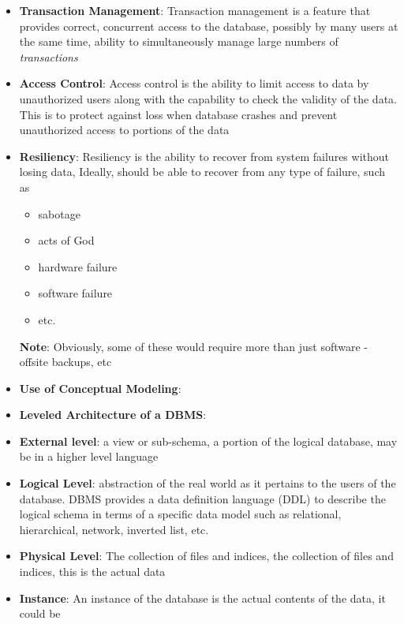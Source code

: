 \documentclass{report}
\begin{document}
\begin{itemize}
\begin{itemize}
            \end{itemize}
        \item \textbf{Transaction Management}: Transaction management is a feature that provides correct, concurrent access to the database, possibly by many users at the same time, ability to simultaneously manage large numbers of \textit{transactions}
        \item \textbf{Access Control}: Access control is the ability to limit access to data by unauthorized users along with the capability to check the validity of the data. This is to protect against loss when database crashes and prevent unauthorized access to portions of the data
        \item \textbf{Resiliency}: Resiliency is the ability to recover from system failures without losing data, Ideally, should be able to recover from any type of failure, such as 
            \begin{itemize}
                \item sabotage
                \item acts of God
                \item hardware failure
                \item software failure
                \item etc.
            \end{itemize}
            \bigbreak \noindent 
            \textbf{Note}: Obviously, some of these would require more than just software - offsite backups, etc
        \item \textbf{Use of Conceptual Modeling}:
            \bigbreak \noindent 
        \item \textbf{Leveled Architecture of a DBMS}:
            \bigbreak \noindent 
        \item \textbf{External level}: a view or sub-schema, a portion of the logical database, may be in a higher level language
        \item \textbf{Logical Level}: abstraction of the real world as it pertains to the users of the database. DBMS provides a data definition language (DDL) to describe the logical schema in terms of a specific data model such as relational, hierarchical, network, inverted list, etc.
        \item \textbf{Physical Level}: The collection of files and indices, the collection of files and indices, this is the actual data
        \item \textbf{Instance}: An instance of the database is the actual contents of the data, it could be 

\end{itemize}
\end{document}
